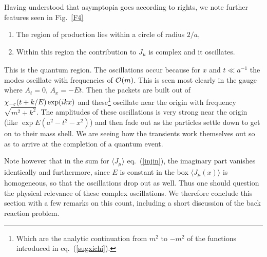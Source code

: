\documentclass[12pt,oneside]{report}
\begin{document}
 \par Having understood that asymptopia goes according
to rights, we note further features seen in Fig.~\ref{F4}
\begin{enumerate}
\renewcommand{\labelenumi}{\arabic{enumi})}
\item The region of production lies within a circle 
of radius $2/a$,
\item Within this region the contribution to $J_{\mu}$ is complex and it
oscillates.
\end{enumerate}
This is the quantum region.  The oscillations occur because for $x$ and
$t \ll a^{-1}$ the modes oscillate with frequencies of ${\cal O} (m)$.
This is seen most clearly in the gauge where $A_t = 0$, $A_x=-Et$.  Then
the packets are built out of $\chi_{-\varepsilon} (t + k/E)\/\exp(ikx)$ 
 and these\footnote{Which are the analytic continuation from $m^2$ to $-m^2$ of the functions
introduced in eq.~(\ref{sugxichi}).}
oscillate near the origin with frequency $\sqrt{m^2 + k^2}$.  The 
amplitudes of these oscillations is very strong near the origin
(like $\exp E(a^2 - t^2 -x^2)$) and then fade out as the particles
settle down to get on to their mass shell.  We are
seeing how the transients work themselves out so as
to arrive at the completion of a quantum event.

\par  Note however that in the sum for $\langle J_{\mu} \rangle $
eq.~(\ref{injin}), the imaginary
part vanishes identically and
furthermore, since $E$ is constant in the box $\langle J_{\mu}(x)\rangle$
is homogeneous, so that
the oscillations drop out as well. 
Thus one should question the physical relevance of these complex 
oscillations. 
We therefore conclude this section with a few remarks on this count, including
a short discussion of the back reaction problem.
\end{document}
